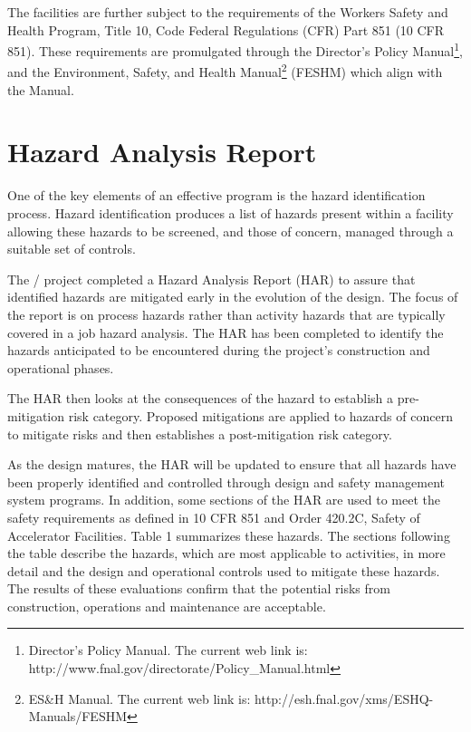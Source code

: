 The \fnal facilities are further subject to the requirements of the
 Workers Safety and Health Program, Title
10, Code Federal Regulations (CFR) Part 851 (10 CFR 851).  These
requirements are promulgated through the \fnal Director's Policy
Manual\footnote{\fnal Director's Policy Manual. The current web
  link is: http://www.fnal.gov/directorate/Policy\_Manual.html}, and
the \fnal Environment, Safety, and Health Manual\footnote{\fnal
  ES\&H Manual. The current web link is:
  http://esh.fnal.gov/xms/ESHQ-Manuals/FESHM} (FESHM) which align with
the \surf {} Manual.

\section{Hazard Analysis Report}

One of the key elements of an effective  program is the hazard
identification process. Hazard identification produces a list of
hazards present within a facility allowing these hazards to be
screened, and those of concern, managed through a suitable set of
controls.

The / project completed a Hazard Analysis Report (HAR) to
assure that identified hazards are mitigated early in the evolution of
the design.  The focus of the report is on process hazards rather than
activity hazards that are typically covered in a job hazard analysis.
The HAR has been completed to identify the hazards anticipated to be
encountered during the project's construction and operational phases.

The HAR then looks at the consequences of the hazard to establish a
pre-mitigation risk category. Proposed mitigations are applied to
hazards of concern to mitigate risks and then establishes a
post-mitigation risk category.

As the  design matures, the HAR will be updated to ensure that all
hazards have been properly identified and controlled through design
and safety management system programs.  In addition, some sections of
the HAR are used to meet the safety requirements as defined in 10 CFR
851 and  Order 420.2C, Safety of Accelerator Facilities.  Table 1
summarizes these hazards.  The sections following the table describe
the hazards, which are most applicable to  activities, in more
detail and the design and operational controls used to mitigate these
hazards. The results of these evaluations confirm that the potential
risks from construction, operations and maintenance are acceptable.

